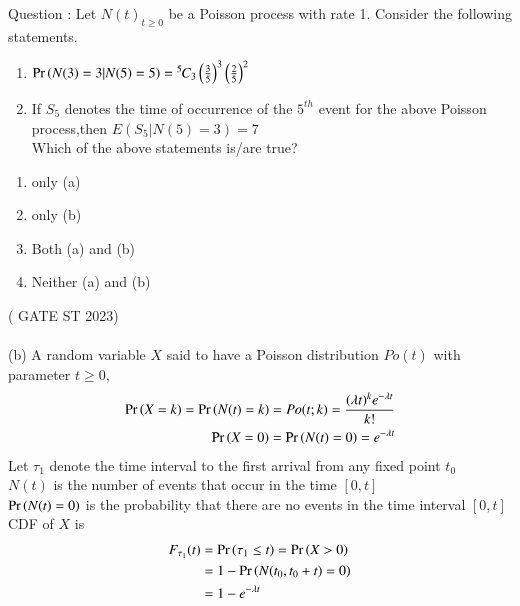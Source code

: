 \documentclass[journal,12pt,onecolumn]{IEEEtran}
\theoremstyle{remark}
\begin{document}
\let\vec\mathbf




\vspace{3cm}



\bigskip

\renewcommand{\thefigure}{\theenumi}
\renewcommand{\thetable}{\theenumi}
Question : Let ${N(t)}_{t\ge 0}$ be a Poisson process with rate 1. Consider the following statements. 
\begin{enumerate}[label=(\alph*)]
\item $\Pr\left(N(3)=3|N(5)=5\right)={{}^{5}\mkern-1muC_{3}}\left(\frac{3}{5}\right)^3 \left(\frac{2}{5}\right)^2$
\item If $S_5$ denotes the time of occurrence of the $5^{th}$ event for the above Poisson process,then $E(S_5|N(5)=3)=7$ \\
Which of the above statements is/are true?\\
\end{enumerate}
\begin{enumerate}[label=(\roman*)]
\item only (a)
\item only (b)
\item Both (a) and (b)
\item Neither (a) and (b)
\end{enumerate}
\hfill ( GATE ST 2023)\\
\solution \\
(b) A random variable $X$ said to have a Poisson distribution $Po(t)$ with parameter $t\geq 0$,\\
 \begin{align}
\Pr\left(X=k\right)=\Pr\left(N(t)=k\right)= Po(t;k)=\frac{(\lambda t)^k e^{-\lambda t}}{k!}    \\
\Pr\left(X=0\right)= \Pr\left(N(t)=0\right) =e^{-\lambda t}
\end{align}
Let $\tau_1 $ denote the time interval to the first arrival from any fixed point $t_0$\\
$N(t)$ is the number of events that occur in the time $[0,t]$\\
$\Pr\left(N(t)=0\right)$ is the probability that there are no events in the time interval $[0,t]$\\
CDF of $X$ is \\
\begin{align}
F_{\tau_1}(t)&=\Pr\left(\tau_1 \leq t\right)=\Pr\left(X>0\right) \\
&=1-\Pr\left(N(t_0,t_0+t)=0\right)\\
&=1-e^{-\lambda t}
\end{align}
\end{document}
